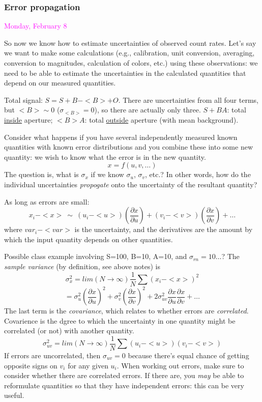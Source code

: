 \documentclass[12pt]{article}
\begin{document}
\textcolor{om}{\emph{}}

\subsubsection*{Error propagation}
\textcolor{magenta}{Monday, February 8}

So now we know how to estimate uncertainties of observed count rates.
Let's say we want to make some calculations (e.g., calibration, unit
conversion, averaging, conversion to magnitudes, calculation of
colors, etc.) using these observations: we need to be able to estimate
the uncertainties in the calculated quantities that depend on our
measured quantities.

\textcolor{myBlue}{
Total signal: $ S=S+B-<B>+O $. There are uncertainties from all
four terms, but $<B> \sim 0$ ($\sigma_{<B>}=0$), so there are
actually only three. $S+BA$: total \underline{inside} aperture;
$<B>A$: total \underline{outside} aperture (with mean background).}

Consider what happens if you have several independently measured
known quantities with known
error distributions and you combine these into some new quantity: we
wish to know what the error is in the new quantity.
    $$ x = f(u, v, \ldots) $$
The question is, what is $\sigma_x$ if we know
$\sigma_u$, $\sigma_v$, etc.?
\textcolor{myBlue}{In other words, how do the individual uncertainties
\emph{propogate} onto the uncertainty of the resultant quantity?}

As long as errors are small:
    $$ x_i - <x> \ \sim \
        (u_i - <u>)\left(\frac{\partial x}{\partial u}\right)
       + (v_i - <v>)\left( \frac{\partial x}{\partial v}  \right)
       + \ldots  $$
where $var_i - <var>$ is the uncertainty, and the derivatives are the
amount by which the input quantity depends on other quantities.

\textcolor{myBlue}{
Possible class example involving
S=100, B=10, A=10, and $\sigma_{rn}=10\ldots$?
The \emph{sample variance} (by definition, see above notes) is}
    $$ \sigma_x^2 = lim(N \rightarrow \infty)\frac{1}{N}
       \sum(x_i - <x>)^2 $$
    $$ = \sigma_u^2\left(\frac{\partial x}{\partial u}\right)^2
       + \sigma_v^2\left(\frac{\partial x}{\partial v}\right)^2
       + 2\sigma_{uv}^2\frac{\partial x}{\partial u}
         \frac{\partial x}{\partial v} + \ldots $$
The last term is the \emph{covariance}, which relates to whether
errors are \emph{correlated}.
\textcolor{myBlue}{Covarience is the dgree to which the uncertainty
in one quantity might be correlated (or not) with another quantity}.
    $$ \sigma_{uv}^2 = lim(N \rightarrow\infty)\frac{1}{N}
       \sum(u_i - <u>)(v_i - <v>)  $$
If errors are uncorrelated, then $\sigma_{uv} = 0$ because there's
equal chance of getting opposite signs on $v_i$ for any given $u_i$.
When working out errors, make sure to consider whether there are
correlated errors. If there are, you \emph{may} be able to reformulate
quantities so that they have independent errors: this can be very
useful.
\end{document}
